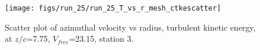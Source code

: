 \begin{figure}[H]
\centering
\texttt{[image: figs/run\_25/run\_25\_T\_vs\_r\_mesh\_ctkescatter]}
\caption{Scatter plot of azimuthal velocity vs radius, turbulent kinetic energy, at $z/c$=7.75, $V_{free}$=23.15, station 3.}
\label{fig:run_25_T_vs_r_mesh_ctkescatter}
\end{figure}


